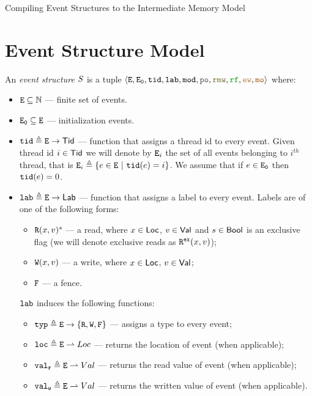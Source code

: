 \documentclass[12pt]{article}
\begin{document}
\begin{center}
{\center \LARGE Compiling Event Structures to the Intermediate Memory Model }
\end{center}

\section{Event Structure Model}

\begin{definition}
  An \emph{event structure} $S$ is a tuple
  $\tup{\lE, \lEi, \lTID, \lLAB, \lMOD, \lPO, \lRMW, \lRF, \lEW, \lMO}$ where:
  \begin{itemize}
  \item ${\mathtt{E}} \subseteq {\mathbb{N}}$ --- finite set of events. 
  \item ${\mathtt{E_0}} \subseteq {\mathtt{E}}$ --- initialization events.
  \item ${\mathtt{tid}} \triangleq {\mathtt{E}} \rightarrow \mathsf{Tid}$ --- function that assigns a thread id to every event.
    Given thread id $i \in \mathsf{Tid}$ we will denote by ${\mathtt{E}}_i$ the set of all events belonging 
    to $i^{th}$ thread, that is ${\mathtt{E}}_i \triangleq \{e \in {\mathtt{E}} ~|~ {\mathtt{tid}}(e) = i\}$.
    We assume that if $e \in {\mathtt{E_0}}$ then ${\mathtt{tid}}(e) = 0$.
  \item ${\mathtt{lab}} \triangleq {\mathtt{E}} \rightarrow \mathsf{Lab}$ --- function that assigns a label to every event.
    Labels are of one of the following forms:
    \begin{itemize}
    \item ${\mathtt{R}}({x},{v})^s$ --- a read, where $x \in \mathsf{Loc}$, $v \in \mathsf{Val}$ 
      and $s \in \mathsf{Bool}$ is an exclusive flag 
      (we will denote exclusive reads as ${\mathtt{R}}^{{\mathtt{ex}}}({x},{v})$);
    \item ${\mathtt{W}}({x},{v})$ --- a write, where $x \in \mathsf{Loc}$, $v \in \mathsf{Val}$;
    \item ${\mathtt{F}}$ --- a fence.
    \end{itemize}
    ${\mathtt{lab}}$ induces the following functions:
    \begin{itemize}
    \item ${\mathtt{typ}} \triangleq {\mathtt{E}} \rightarrow \{{\mathtt{R}}, {\mathtt{W}}, {\mathtt{F}}\}$ --- assigns a type to every event;
    \item ${\mathtt{loc}} \triangleq {\mathtt{E}} \rightharpoonup Loc$ --- returns the location of event (when applicable);
    \item ${\mathtt{val_r}} \triangleq {\mathtt{E}} \rightharpoonup Val$ --- returns the read value of event (when applicable);
    \item ${\mathtt{val_w}} \triangleq {\mathtt{E}} \rightharpoonup Val$ --- returns the written value of event (when applicable).
    \end{itemize}

\end{itemize}
\end{definition}
\end{document}
